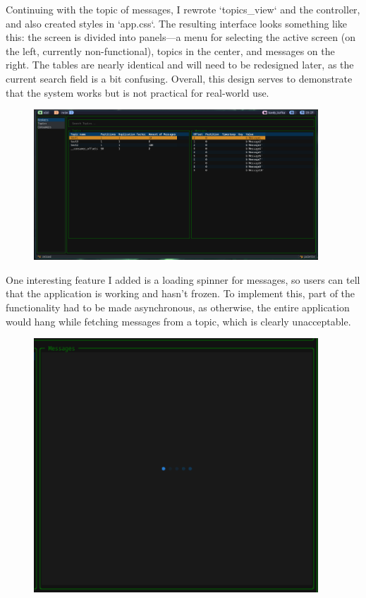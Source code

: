 \documentclass[10pt , a4paper]{report}
\begin{document}
Continuing with the topic of messages, I rewrote `topics\_view` and the controller, and also created styles in `app.css`. The resulting interface looks something like this: the screen is divided into panels—a menu for selecting the active screen (on the left, currently non-functional), topics in the center, and messages on the right. The tables are nearly identical and will need to be redesigned later, as the current search field is a bit confusing. Overall, this design serves to demonstrate that the system works but is not practical for real-world use.

\begin{figure}[htpb]
  \begin{center}
    \includegraphics[width=0.95\textwidth]{imgs/FinalUI.png}
  \end{center}
  \caption{}\label{fig:}
\end{figure}

One interesting feature I added is a loading spinner for messages, so users can tell that the application is working and hasn’t frozen. To implement this, part of the functionality had to be made asynchronous, as otherwise, the entire application would hang while fetching messages from a topic, which is clearly unacceptable.

\begin{figure}[htbp]
  \begin{center}
    \includegraphics[width=0.95\textwidth]{imgs/MessagesSpinner.png}
  \end{center}
  \caption{}\label{fig:}
\end{figure}
\newpage
\end{document}
